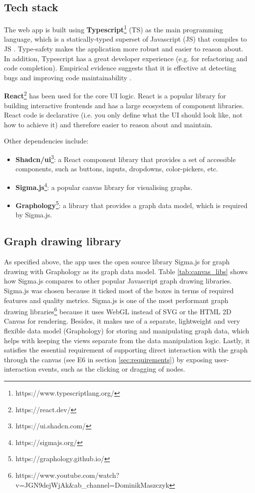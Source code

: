\documentclass{l4proj}
\begin{document}
\subsection{Tech stack}

The web app is built using \textbf{Typescript}\footnote{https://www.typescriptlang.org/} (TS) as the main programming language, which is a statically-typed superset of Javascript (JS) that compiles to JS \citep{typescript}. Type-safety makes the application more robust and easier to reason about. In addition, Typescript has a great developer experience (e.g. for refactoring and code completion). Empirical evidence suggests that it is effective at detecting bugs and improving code maintainability \citep{typescript_bugs_paper}.

\textbf{React}\footnote{https://react.dev/} has been used for the core UI logic. React is a popular library for building interactive frontends and has a large ecosystem of component libraries. React code is declarative (i.e. you only define what the UI should look like, not how to achieve it) and therefore easier to reason about and maintain.

Other dependencies include:
\begin{itemize}
    \item \textbf{Shadcn/ui}\footnote{https://ui.shadcn.com/}: a React component library that provides a set of accessible components, such as buttons, inputs, dropdowns, color-pickers, etc.
    \item \textbf{Sigma.js}\footnote{https://sigmajs.org/}: a popular canvas library for visualising graphs.
    \item \textbf{Graphology}\footnote{https://graphology.github.io/}: a library that provides a graph data model, which is required by Sigma.js.
\end{itemize}



\subsection{Graph drawing library}
As specified above, the app uses the open source library Sigma.js for graph drawing with Graphology as its graph data model. Table \ref{tab:canvas_libs} shows how Sigma.js compares to other popular Javascript graph drawing libraries. Sigma.js was chosen because it ticked most of the boxes in terms of required features and quality metrics.
Sigma.js is one of the most performant graph drawing libraries\footnote{https://www.youtube.com/watch?v=JGN9dejWjAk\&ab\_channel=DominikMaszczyk} because it uses WebGL instead of SVG or the HTML 2D Canvas for rendering. Besides, it makes use of a separate, lightweight and very flexible data model (Graphology) for storing and manipulating graph data, which helps with keeping the views separate from the data manipulation logic.
Lastly, it satisfies the essential requirement of supporting direct interaction with the graph through the canvas (see E6 in section \ref{sec:requirements}) by exposing user-interaction events, such as the clicking or dragging of nodes.
\end{document}
